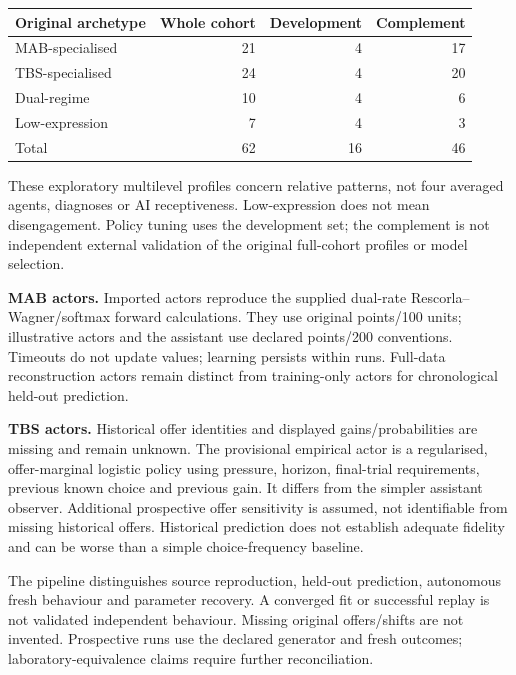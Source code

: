\documentclass[11pt,a4paper]{article}
\begin{document}
\begin{center}
\small
\begin{tabular}{@{}lrrr@{}}
\toprule
Original archetype & Whole cohort & Development & Complement\\
\midrule
MAB-specialised & 21 & 4 & 17\\
TBS-specialised & 24 & 4 & 20\\
Dual-regime & 10 & 4 & 6\\
Low-expression & 7 & 4 & 3\\
\midrule
Total & 62 & 16 & 46\\
\bottomrule
\end{tabular}
\end{center}
These exploratory multilevel profiles concern relative patterns, not four averaged agents, diagnoses or AI receptiveness. Low-expression does not mean disengagement. Policy tuning uses the development set; the complement is not independent external validation of the original full-cohort profiles or model selection.

\textbf{MAB actors.} Imported actors reproduce the supplied dual-rate Rescorla--Wagner/softmax forward calculations. They use original points/100 units; illustrative actors and the assistant use declared points/200 conventions. Timeouts do not update values; learning persists within runs. Full-data reconstruction actors remain distinct from training-only actors for chronological held-out prediction.

\textbf{TBS actors.} Historical offer identities and displayed gains/probabilities are missing and remain unknown. The provisional empirical actor is a regularised, offer-marginal logistic policy using pressure, horizon, final-trial requirements, previous known choice and previous gain. It differs from the simpler assistant observer. Additional prospective offer sensitivity is assumed, not identifiable from missing historical offers. Historical prediction does not establish adequate fidelity and can be worse than a simple choice-frequency baseline.

The pipeline distinguishes source reproduction, held-out prediction, autonomous fresh behaviour and parameter recovery. A converged fit or successful replay is not validated independent behaviour. Missing original offers/shifts are not invented. Prospective runs use the declared generator and fresh outcomes; laboratory-equivalence claims require further reconciliation.
\end{document}
